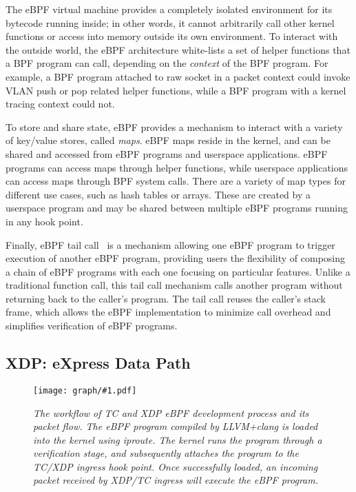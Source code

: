\documentclass[10pt]{sigplanconf}
\newcommand{\myfig}[3]
 {
 \begin{figure}
 \centerline{\texttt{[image: graph/\#1.pdf]}}
 \caption{\sl \small #3}
 \label{#1:fig}
 \vspace*{-0.15in}
 \end{figure}
 }
\begin{document}
The eBPF virtual machine provides a completely isolated environment for its
bytecode running inside; in other words, it cannot arbitrarily call other
kernel functions or access into memory outside its own environment. To interact
with the outside world, the eBPF architecture white-lists a set of helper
functions that a BPF program can call, depending on the {\em context} of the
BPF program.  For example, a BPF program attached to raw socket in a packet
context could invoke VLAN push or pop related helper functions, while a BPF
program with a kernel tracing context could not. %

To store and share state, eBPF provides a mechanism to interact with a variety
of key/value stores, called \textit{maps}. eBPF maps reside in the kernel, and can be
shared and accessed from eBPF programs and userspace applications. eBPF
programs can access maps through helper functions, while userspace applications
can access maps through BPF system calls. There are a variety of map types for
different use cases, such as hash tables or arrays. These are created by a
userspace program and may be shared between multiple eBPF programs running in
any hook point.

Finally, eBPF tail call~\cite{tailcall} is a mechanism allowing one eBPF program to trigger execution of 
another eBPF program, providing users the flexibility of composing a chain of
eBPF programs with each one focusing on particular features.  Unlike a
traditional function call, this tail call mechanism calls another program
without returning back to the caller's program. The tail call reuses the
caller's stack frame, which allows the eBPF implementation to minimize call
overhead and simplifies verification of eBPF programs.

\subsection{XDP: eXpress Data Path}
\myfig{tcebpf}{2.6in}{The workflow of TC and XDP eBPF development process and its
packet flow.  The eBPF program compiled by LLVM+clang is loaded into the kernel
using iproute. The kernel runs the program through a verification stage, and
subsequently attaches the program to the TC/XDP ingress hook point.  Once
successfully loaded, an incoming packet received by XDP/TC ingress will execute the
eBPF program.}
\end{document}
